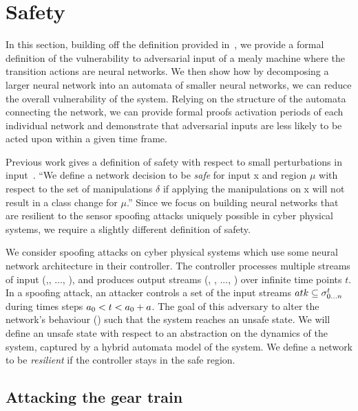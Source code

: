 \section{Safety}

In this section, building off the definition provided in~\cite{DBLP:journals/corr/HuangKWW16}, we provide a formal definition of the vulnerability to adversarial input of a mealy machine where the transition actions are neural networks.
We then show how by decomposing a larger neural network into an automata of smaller neural networks, we can reduce the overall vulnerability of the system.
Relying on the structure of the automata connecting the network, we can provide formal proofs activation periods of each individual network and demonstrate that adversarial inputs are less likely to be acted upon within a given time frame.

Previous work gives a definition of safety with respect to small perturbations in input~\cite{DBLP:journals/corr/HuangKWW16}.
``We define a network decision to be \textit{safe} for input x and region $\mu$ with respect to the set of manipulations $\delta$ if applying the manipulations on x will not result in a class change for $\mu$.''
Since we focus on building neural networks that are resilient to the sensor spoofing attacks uniquely possible in cyber physical systems, we require a slightly different definition of safety.

We consider spoofing attacks on cyber physical systems which use some neural network architecture in their controller.
The controller processes multiple streams of input (,, ..., ), and produces output streams (, , ..., ) over infinite time points $t$.
In a spoofing attack, an attacker controls a set of the input streams $atk \subseteq \sigma_{0...n}^{t}$ during times steps $a_{0}<t<a_{0}+a$.
The goal of this adversary to alter the network's behaviour () such that the system reaches an unsafe state.
We will define an unsafe state with respect to an abstraction on the dynamics of the system, captured by a hybrid automata model of the system.
We define a network to be \textit{resilient} if the controller stays in the safe region.


\subsection{Attacking the gear train}

